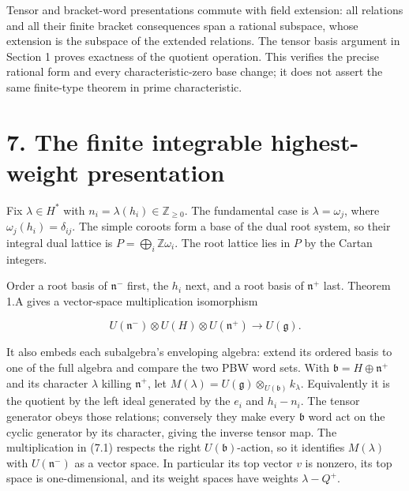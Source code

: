 \documentclass[11pt,a4paper,openany]{report}
\begin{document}
Tensor and bracket-word presentations commute with field extension: all relations and all their finite bracket consequences span a rational subspace, whose extension is the subspace of the extended relations. The tensor basis argument in Section 1 proves exactness of the quotient operation. This verifies the precise rational form and every characteristic-zero base change; it does not assert the same finite-type theorem in prime characteristic.

\section{7. The finite integrable highest-weight presentation}\label{AG-RG-S06-the-finite-integrable-highest-weight-presentation}

Fix \(\lambda\in H^*\) with \(n_i=\lambda(h_i)\in\mathbb Z_{\ge0}\). The fundamental case is \(\lambda=\omega_j\), where \(\omega_j(h_i)=\delta_{ij}\). The simple coroots form a base of the dual root system, so their integral dual lattice is \(P=\bigoplus_i\mathbb Z\omega_i\). The root lattice lies in \(P\) by the Cartan integers.

Order a root basis of \(\mathfrak n^-\) first, the \(h_i\) next, and a root basis of \(\mathfrak n^+\) last. Theorem 1.A gives a vector-space multiplication isomorphism

\[
U(\mathfrak n^-)\otimes U(H)\otimes U(\mathfrak n^+)
\longrightarrow U(\mathfrak g).
\tag{7.1}
\]

It also embeds each subalgebra's enveloping algebra: extend its ordered basis to one of the full algebra and compare the two PBW word sets. With \(\mathfrak b=H\oplus\mathfrak n^+\) and its character \(\lambda\) killing \(\mathfrak n^+\), let \(M(\lambda)=U(\mathfrak g)\otimes_{U(\mathfrak b)}k_\lambda\). Equivalently it is the quotient by the left ideal generated by the \(e_i\) and \(h_i-n_i\). The tensor generator obeys those relations; conversely they make every \(\mathfrak b\) word act on the cyclic generator by its character, giving the inverse tensor map. The multiplication in (7.1) respects the right \(U(\mathfrak b)\)-action, so it identifies \(M(\lambda)\) with \(U(\mathfrak n^-)\) as a vector space. In particular its top vector \(v\) is nonzero, its top space is one-dimensional, and its weight spaces have weights \(\lambda-Q^+\).
\end{document}
